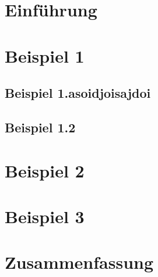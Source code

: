 \chapter{Einführung}

\chapter{Beispiel 1}
\lipsum
\section{Beispiel 1.asoidjoisajdoi}
\lipsum[1]
\section{Beispiel 1.2}
\lipsum
\chapter{Beispiel 2}
\lipsum
\chapter{Beispiel 3}
\lipsum


\chapter{Zusammenfassung}
